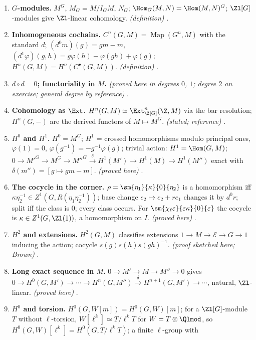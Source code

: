 \begin{enumerate}[label=\textbf{\thechapter.\arabic*}]
\item \textbf{$G$-modules.} $M^G$, $M_G=M/I_GM$, $N_G$; $\Hom_G(M,N)=\Hom(M,N)^G$; $\Zl[G]$-modules give $\Zl$-linear cohomology. \emph{(definition)} .
\item \textbf{Inhomogeneous cochains.} $C^n(G,M)=\operatorname{Map}(G^n,M)$ with the standard $d$; $(d^0m)(g)=gm-m$, $(d^1\varphi)(g,h)=g\varphi(h)-\varphi(gh)+\varphi(g)$;
$H^n(G,M)=H^n(C^\bullet(G,M))$. \emph{(definition)} .
\item \textbf{$d\circ d=0$; functoriality in $M$.} \emph{(proved here in degrees $0$, $1$; degree $2$ an exercise; general degree by reference)} .
\item \textbf{Cohomology as $\Ext$.} $H^n(G,M)\simeq\Ext^n_{\Z[G]}(\Z,M)$ via the bar resolution; $H^n(G,-)$ are the derived functors of $M\mapsto M^G$. \emph{(stated; reference)}
.
\item \textbf{$H^0$ and $H^1$.} $H^0=M^G$; $H^1$ = crossed homomorphisms modulo principal ones, $\varphi(1)=0$, $\varphi(g^{-1})=-g^{-1}\varphi(g)$; trivial action: $H^1=\Hom(G,M)$;
$0\to M'^G\to M^G\to M''^G\xrightarrow{\delta}H^1(M')\to H^1(M)\to H^1(M'')$ exact with $\delta(m'')=[g\mapsto gm-m]$. \emph{(proved here)} .
\item \textbf{The cocycle in the corner.} $\rho=\sm{\eta_1}{\kappa}{0}{\eta_2}$ is a homomorphism iff $\kappa\eta_2^{-1}\in Z^1(G,R(\eta_1\eta_2^{-1}))$; base change $e_2\mapsto e_2+re_1$ changes it
by $d^0r$; split iff the class is $0$; every class occurs. For $\sm{\chi_\ell\varepsilon}{\varepsilon\kappa}{0}{\varepsilon}$ the cocycle is $\kappa\in Z^1(G,\Zl(1))$, a homomorphism on $I$.
\emph{(proved here)} .
\item \textbf{$H^2$ and extensions.} $H^2(G,M)$ classifies extensions $1\to M\to\mathcal E\to G\to1$ inducing the action; cocycle $s(g)s(h)s(gh)^{-1}$. \emph{(proof sketched here;
Brown)} .
\item \textbf{Long exact sequence in $M$.} $0\to M'\to M\to M''\to0$ gives $0\to H^0(G,M')\to\cdots\to H^n(G,M'')\xrightarrow{\delta}H^{n+1}(G,M')\to\cdots$, natural, $\Zl$-linear.
\emph{(proved here)} .
\item \textbf{$H^0$ and torsion.} $H^0(G,W[m])=H^0(G,W)[m]$; for a $\Zl[G]$-module $T$ without $\ell$-torsion, $W[\ell^k]\simeq T/\ell^kT$ for $W=T\otimes\Qlmod$, so $H^0(G,W)[\ell^k]=H^0(G,T/\ell^kT)$; a finite $\ell$-group with

\end{enumerate}

